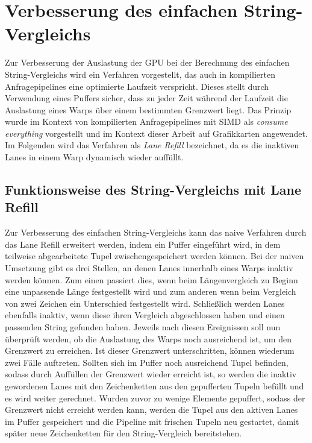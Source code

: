 \chapter{Verbesserung des einfachen String-Vergleichs}
\label{sec:equals_lane_refill}

Zur Verbesserung der Auslastung der GPU bei der Berechnung des einfachen String-Vergleichs wird ein Verfahren vorgestellt, das auch in kompilierten Anfragepipelines eine optimierte Laufzeit verspricht.
Dieses stellt durch Verwendung eines Puffers sicher, dass zu jeder Zeit während der Laufzeit die Auslastung eines Warps über einem bestimmten Grenzwert liegt.
Das Prinzip wurde im Kontext von kompilierten Anfragepipelines mit SIMD als \emph{consume everything} vorgestellt \cite{Lang2018} und im Kontext dieser Arbeit auf Grafikkarten angewendet.
Im Folgenden wird das Verfahren als \emph{Lane Refill} bezeichnet, da es die inaktiven Lanes in einem Warp dynamisch wieder auffüllt.

\section{Funktionsweise des String-Vergleichs mit Lane Refill}
\label{sec:equals_lane_refill_funktionsweise}

Zur Verbesserung des einfachen String-Vergleichs kann das naive Verfahren durch das Lane Refill erweitert werden, indem ein Puffer eingeführt wird, in dem teilweise abgearbeitete Tupel zwischengespeichert werden können.
Bei der naiven Umsetzung gibt es drei Stellen, an denen Lanes innerhalb eines Warps inaktiv werden können.
Zum einen passiert dies, wenn beim Längenvergleich zu Beginn eine unpassende Länge festgestellt wird und zum anderen wenn beim Vergleich von zwei Zeichen ein Unterschied festgestellt wird.
Schließlich werden Lanes ebenfalls inaktiv, wenn diese ihren Vergleich abgeschlossen haben und einen passenden String gefunden haben.
Jeweils nach diesen Ereignissen soll nun überprüft werden, ob die Auslastung des Warps noch ausreichend ist, um den Grenzwert zu erreichen.
Ist dieser Grenzwert unterschritten, können wiederum zwei Fälle auftreten.
Sollten sich im Puffer noch ausreichend Tupel befinden, sodass durch Auffüllen der Grenzwert wieder erreicht ist, so werden die inaktiv gewordenen Lanes mit den Zeichenketten aus den gepufferten Tupeln befüllt und es wird weiter gerechnet.
Wurden zuvor zu wenige Elemente gepuffert, sodass der Grenzwert nicht erreicht werden kann, werden die Tupel aus den aktiven Lanes im Puffer gespeichert und die Pipeline mit frischen Tupeln neu gestartet, damit später neue Zeichenketten für den String-Vergleich bereitstehen.


